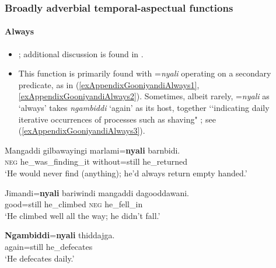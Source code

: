 \subsubsection{Broadly adverbial temporal-aspectual functions}
\paragraph{Always}
\label{appendixGooniyandiAlways}
\begin{itemize}
	\item \textcite[464]{McGregor1990}; additional discussion is found in \textcite{SchultzeBerndt2002}.
	\item This function is primarily found with \mbox{=\textit{nyali}} operating on a secondary predicate, as in (\ref{exAppendixGooniyandiAlways1}, \ref{exAppendixGooniyandiAlways2}). Sometimes, albeit rarely, \mbox{=\textit{nyali}} as \lq always' takes \textit{ngambiddi} \lq again' as its host, together \lq\lq indicating daily iterative occurrences of processes such as shaving" \parencite[464]{McGregor1990}; see (\ref{exAppendixGooniyandiAlways3}).
\end{itemize}
\begin{exe}
	\ex\label{exAppendixGooniyandiAlways1}
	\gll Mangaddi gilbawayingi marlami=\textbf{nyali} barnbidi.\\
	\textsc{neg} he\_was\_finding\_it without=still he\_returned\\
	\glt \lq He would never find (anything); he’d always return empty handed.' \parencite[464]{McGregor1990}

	\ex\label{exAppendixGooniyandiAlways2}
	\gll Jimandi=\textbf{nyali} bariwindi mangaddi dagooddawani.\\
	good=still he\_climbed \textsc{neg} he\_fell\_in\\
	\glt \lq He climbed well all the way; he didn't fall.' \parencite[465]{McGregor1990}

	\ex\label{exAppendixGooniyandiAlways3}
\gll \textbf{Ngambiddi}=\textbf{nyali} thiddajga.\\
again=still he\_defecates\\
	\glt \lq He defecates daily.' \parencite[464]{McGregor1990}
\end{exe}

